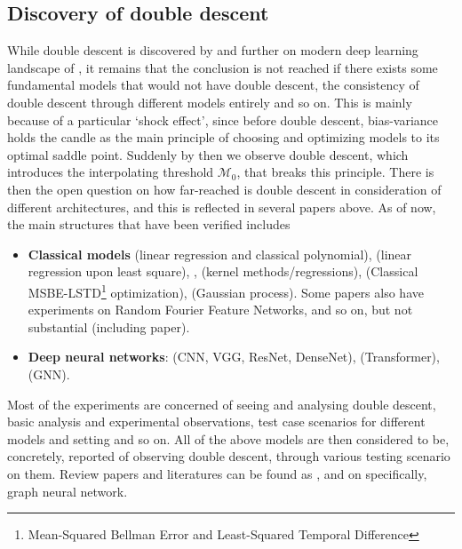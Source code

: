 \documentclass[10pt]{article} %
\begin{document}
\subsection{Discovery of double descent}
While double descent is discovered by \cite{belkin_reconciling_2019} and further on modern deep learning landscape of \cite{nakkiran_deep_2019}, it remains that the conclusion is not reached if there exists some fundamental models that would not have double descent, the consistency of double descent through different models entirely and so on. This is mainly because of a particular `shock effect', since before double descent, bias-variance holds the candle as the main principle of choosing and optimizing models to its optimal saddle point. Suddenly by then we observe double descent, which introduces the interpolating threshold $\mathcal{M}_{0}$, that breaks this principle. There is then the open question on how far-reached is double descent in consideration of different architectures, and this is reflected in several papers above. As of now, the main structures that have been verified includes
\begin{itemize}[topsep=1pt, itemsep=1pt]
    \item \textbf{Classical models} \cite{Yang_2024,nakkiran2019moredata,schaeffer_double_2023,lafon_understanding_2024} (linear regression and classical polynomial), \cite{NEURIPS2024_2d43f7a6} (linear regression upon least square), \cite{liu2021kernelregressionhighdimensions}, \cite{zhang2024manipulatingsparsedoubledescent,allerbo2025changingkerneltrainingleads} (kernel methods/regressions), \cite{brellmann2024on} (Classical MSBE-LSTD\footnote{Mean-Squared Bellman Error and Least-Squared Temporal Difference} optimization), \cite{harzli2023doubledescentcurvesneuralnetworks} (Gaussian process). Some papers also have experiments on Random Fourier Feature Networks, and so on, but not substantial (including \cite{belkin_reconciling_2019} paper). 
    \item \textbf{Deep neural networks}: \cite{luo2023doubledescentdiscrepancytask,Yang_2024,pezeshki2021multiscalefeaturelearningdynamics} (CNN, VGG, ResNet, DenseNet), \cite{nakkiran_deep_2019} (Transformer), \cite{shi2024homophilymodulatesdoubledescent} (GNN). 
\end{itemize}

Most of the experiments are concerned of seeing and analysing double descent, basic analysis and experimental observations, test case scenarios for different models and setting and so on. All of the above models are then considered to be, concretely, reported of observing double descent, through various testing scenario on them. Review papers and literatures can be found as \cite{schaeffer_double_2023,ErdongHu2021}, and \cite{shi2024homophilymodulatesdoubledescent} on specifically, graph neural network. 
\end{document}
